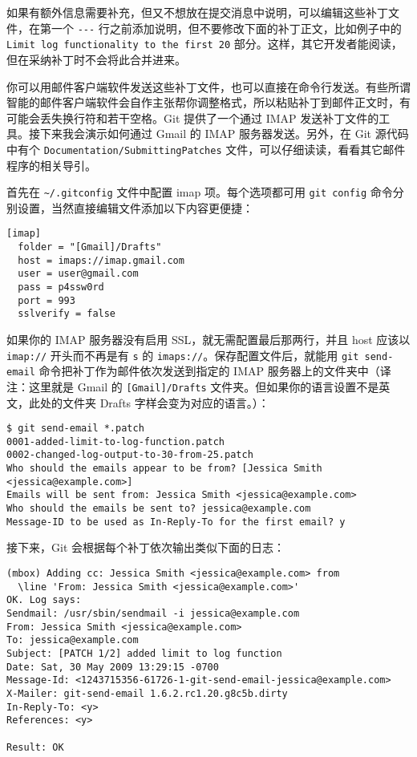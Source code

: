 \documentclass[a4paper]{book}
\begin{document}
如果有额外信息需要补充，但又不想放在提交消息中说明，可以编辑这些补丁文件，在第一个 \texttt{-{}-{}-} 行之前添加说明，但不要修改下面的补丁正文，比如例子中的 \texttt{Limit log functionality to the first 20} 部分。这样，其它开发者能阅读，但在采纳补丁时不会将此合并进来。

你可以用邮件客户端软件发送这些补丁文件，也可以直接在命令行发送。有些所谓智能的邮件客户端软件会自作主张帮你调整格式，所以粘贴补丁到邮件正文时，有可能会丢失换行符和若干空格。Git 提供了一个通过 IMAP 发送补丁文件的工具。接下来我会演示如何通过 Gmail 的 IMAP 服务器发送。另外，在 Git 源代码中有个 \texttt{Documentation/SubmittingPatches} 文件，可以仔细读读，看看其它邮件程序的相关导引。

首先在 \texttt{\textasciitilde{}/.gitconfig} 文件中配置 imap 项。每个选项都可用 \texttt{git config} 命令分别设置，当然直接编辑文件添加以下内容更便捷：

\begin{shaded}\begin{verbatim}
[imap]
  folder = "[Gmail]/Drafts"
  host = imaps://imap.gmail.com
  user = user@gmail.com
  pass = p4ssw0rd
  port = 993
  sslverify = false
\end{verbatim}\end{shaded}

如果你的 IMAP 服务器没有启用 SSL，就无需配置最后那两行，并且 host 应该以 \texttt{imap://} 开头而不再是有 \texttt{s} 的 \texttt{imaps://}。保存配置文件后，就能用 \texttt{git send-email} 命令把补丁作为邮件依次发送到指定的 IMAP 服务器上的文件夹中（译注：这里就是 Gmail 的 \texttt{{[}Gmail{]}/Drafts} 文件夹。但如果你的语言设置不是英文，此处的文件夹 Drafts 字样会变为对应的语言。）：

\begin{shaded}\begin{verbatim}
$ git send-email *.patch
0001-added-limit-to-log-function.patch
0002-changed-log-output-to-30-from-25.patch
Who should the emails appear to be from? [Jessica Smith <jessica@example.com>] 
Emails will be sent from: Jessica Smith <jessica@example.com>
Who should the emails be sent to? jessica@example.com
Message-ID to be used as In-Reply-To for the first email? y
\end{verbatim}\end{shaded}

接下来，Git 会根据每个补丁依次输出类似下面的日志：

\begin{shaded}\begin{verbatim}
(mbox) Adding cc: Jessica Smith <jessica@example.com> from 
  \line 'From: Jessica Smith <jessica@example.com>'
OK. Log says:
Sendmail: /usr/sbin/sendmail -i jessica@example.com
From: Jessica Smith <jessica@example.com>
To: jessica@example.com
Subject: [PATCH 1/2] added limit to log function
Date: Sat, 30 May 2009 13:29:15 -0700
Message-Id: <1243715356-61726-1-git-send-email-jessica@example.com>
X-Mailer: git-send-email 1.6.2.rc1.20.g8c5b.dirty
In-Reply-To: <y>
References: <y>

Result: OK
\end{verbatim}\end{shaded}
\end{document}
